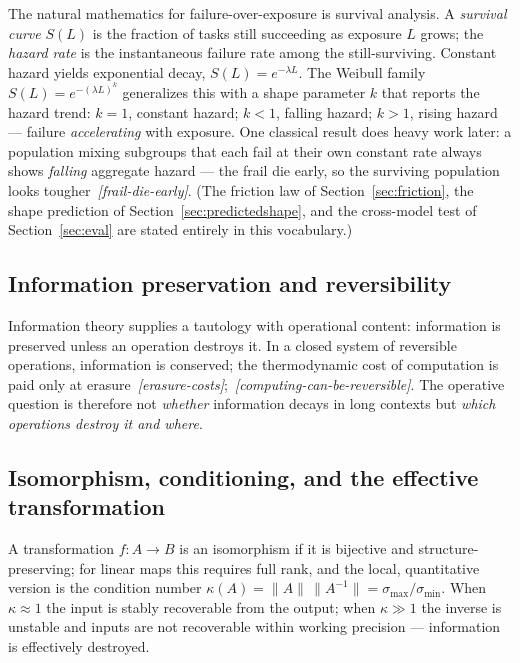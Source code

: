 \documentclass[11pt]{article}
\theoremstyle{remark}
\newif\ifslugs \slugstrue  %
\newcommand{\slug}[1]{\ifslugs\,{\small\textit{[#1]}}\fi}
\begin{document}
The natural mathematics for failure-over-exposure is survival analysis. A
\emph{survival curve} $S(L)$ is the fraction of tasks still succeeding as
exposure $L$ grows; the \emph{hazard rate} is the instantaneous failure rate
among the still-surviving. Constant hazard yields exponential decay,
$S(L) = e^{-\lambda L}$. The Weibull family $S(L) = e^{-(\lambda L)^k}$
generalizes this with a shape parameter $k$ that reports the hazard trend:
$k = 1$, constant hazard; $k < 1$, falling hazard; $k > 1$, rising hazard ---
failure \emph{accelerating} with exposure. One classical result does heavy
work later: a population mixing subgroups that each fail at their own constant
rate always shows \emph{falling} aggregate hazard --- the frail die early, so
the surviving population looks tougher \citep{proschan1963}\slug{frail-die-early}. (The friction law
of Section~\ref{sec:friction}, the shape prediction of
Section~\ref{sec:predictedshape}, and the cross-model test of
Section~\ref{sec:eval} are stated entirely in this vocabulary.)

\subsection{Information preservation and reversibility}

Information theory supplies a tautology with operational content: information is
preserved unless an operation destroys it. In a closed system of reversible
operations, information is conserved; the thermodynamic cost of computation is paid
only at erasure \citep{landauer1961}\slug{erasure-costs}; \citep{bennett1973}\slug{computing-can-be-reversible}. The operative question is therefore not \emph{whether} information decays in long
contexts but \emph{which operations destroy it and where}.

\subsection{Isomorphism, conditioning, and the effective transformation}

A transformation $f : A \to B$ is an isomorphism if it is bijective and
structure-preserving; for linear maps this requires full rank, and the local,
quantitative version is the condition number
$\kappa(A) = \lVert A \rVert \, \lVert A^{-1} \rVert = \sigma_{\max}/\sigma_{\min}$.
When $\kappa \approx 1$ the input is stably recoverable from the output; when
$\kappa \gg 1$ the inverse is unstable and inputs are not recoverable within working
precision --- information is effectively destroyed.
\end{document}

